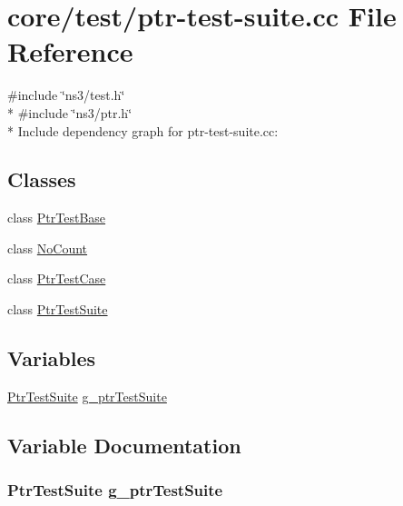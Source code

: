 \hypertarget{ptr-test-suite_8cc}{}\section{core/test/ptr-\/test-\/suite.cc File Reference}
\label{ptr-test-suite_8cc}
{\ttfamily \#include \char`\"{}ns3/test.\+h\char`\"{}}\\*
{\ttfamily \#include \char`\"{}ns3/ptr.\+h\char`\"{}}\\*
Include dependency graph for ptr-\/test-\/suite.cc\+:
\subsection*{Classes}
\begin{DoxyCompactItemize}
\item 
class \hyperlink{classPtrTestBase}{Ptr\+Test\+Base}
\item 
class \hyperlink{classNoCount}{No\+Count}
\item 
class \hyperlink{classPtrTestCase}{Ptr\+Test\+Case}
\item 
class \hyperlink{classPtrTestSuite}{Ptr\+Test\+Suite}
\end{DoxyCompactItemize}
\subsection*{Variables}
\begin{DoxyCompactItemize}
\item 
\hyperlink{classPtrTestSuite}{Ptr\+Test\+Suite} \hyperlink{ptr-test-suite_8cc_abe655fae3e6fde06cc48df3bf25b8652}{g\+\_\+ptr\+Test\+Suite}
\end{DoxyCompactItemize}


\subsection{Variable Documentation}
\subsubsection[{\texorpdfstring{g\+\_\+ptr\+Test\+Suite}{g_ptrTestSuite}}]{\setlength{\rightskip}{0pt plus 5cm} {\bf Ptr\+Test\+Suite}  g\+\_\+ptr\+Test\+Suite\hspace{0.3cm}{\ttfamily [static]}}\hypertarget{ptr-test-suite_8cc_abe655fae3e6fde06cc48df3bf25b8652}{}\label{ptr-test-suite_8cc_abe655fae3e6fde06cc48df3bf25b8652}
